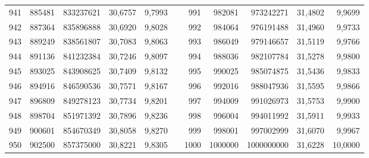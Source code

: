 \begin{longtable}{rrrrrrrrrrr}
941&885481&833237621&30,6757&9,7993&&991&982081&973242271&31,4802&9,9699\\
942&887364&835896888&30,6920&9,8028&&992&984064&976191488&31,4960&9,9733\\
943&889249&838561807&30,7083&9,8063&&993&986049&979146657&31,5119&9,9766\\
944&891136&841232384&30,7246&9,8097&&994&988036&982107784&31,5278&9,9800\\
945&893025&843908625&30,7409&9,8132&&995&990025&985074875&31,5436&9,9833\\
946&894916&846590536&30,7571&9,8167&&996&992016&988047936&31,5595&9,9866\\
947&896809&849278123&30,7734&9,8201&&997&994009&991026973&31,5753&9,9900\\
948&898704&851971392&30,7896&9,8236&&998&996004&994011992&31,5911&9,9933\\
949&900601&854670349&30,8058&9,8270&&999&998001&997002999&31,6070&9,9967\\
950&902500&857375000&30,8221&9,8305&&1000&1000000&1000000000&31,6228&10,0000\\
\end{longtable}
